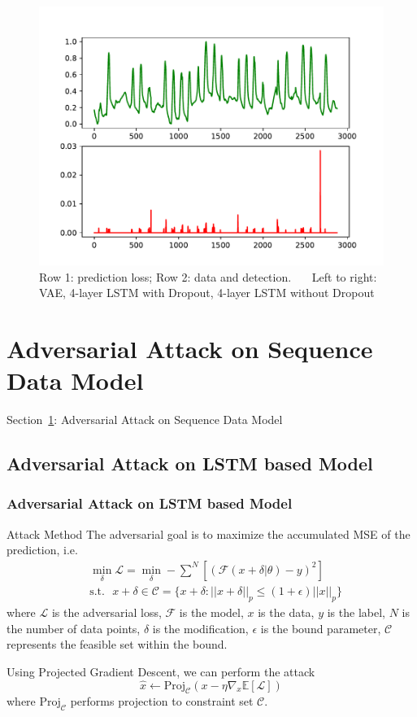 \documentclass{beamer}
\begin{document}
\begin{frame}
\begin{frame}
\begin{frame}
\begin{frame}
\begin{frame}
\begin{figure}
\includegraphics[width=0.32\linewidth]{figs/lstm_h20_detect_4layer.pdf}
\caption{Row 1: prediction loss; Row 2: data and detection. \ \ \ Left to right: VAE, 4-layer LSTM with Dropout, 4-layer LSTM without Dropout}
\end{figure}
\vspace{-0.1in}


\end{frame}


\section{Adversarial Attack on Sequence Data Model}
\label{sec-advattack}
\begin{frame}
\centerline{Section~\ref{sec-advattack}: Adversarial Attack on Sequence Data Model}
\end{frame}

\subsection{Adversarial Attack on LSTM based Model}
\begin{frame}
\frametitle{Adversarial Attack on LSTM based Model}
\begin{block}{Attack Method}
The adversarial goal is to maximize the accumulated MSE of the prediction, i.e.
\[
\begin{split}
& \min_\delta \mathcal{L} = \min_\delta -\sum^N[(\mathcal{F}(x+\delta | \theta) - y)^2] \\
& \text{s.t.} \ \ \ x+\delta \in \mathcal{C} = \{x+\delta: ||x+\delta||_p \leq (1+\epsilon)||x||_p\}
\end{split}
\]
where $\mathcal{L}$ is the adversarial loss, $\mathcal{F}$ is the model, $x$ is the data, $y$ is the label, $N$ is the number of data points, $\delta$ is the modification, $\epsilon$ is the bound parameter, $\mathcal{C}$ represents the feasible set within the bound.

Using Projected Gradient Descent, we can perform the attack
\[
\hat{x} \leftarrow \text{Proj}_\mathcal{C} (x - \eta \nabla_x \mathbb{E}[\mathcal{L}])
\]
where $\text{Proj}_\mathcal{C}$ performs projection to constraint set $\mathcal{C}$.
\end{block}


\end{frame}
\end{frame}
\end{frame}
\end{frame}
\end{frame}
\end{document}

